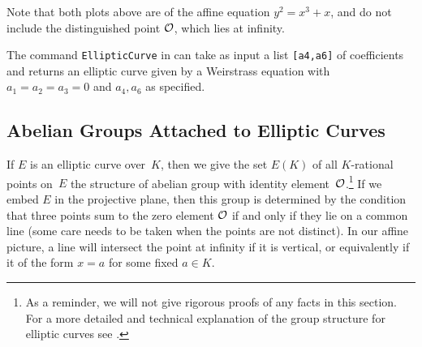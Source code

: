 Note that both plots above are of the affine equation $y^2 = x^3 + x$,
and do not include the distinguished point $\mathcal{O}$, which lies at
infinity.

\begin{remark}
The command {\tt{EllipticCurve}} in \sage
can take as input a list {\tt{[a4,a6]}}
of coefficients and returns an elliptic curve given
by a Weirstrass equation with $a_1=a_2=a_3=0$ and
$a_4,a_6$ as specified.
\end{remark}

\subsection{Abelian Groups Attached to Elliptic Curves}
If $E$ is an elliptic curve over~$K$, then we give the set
$E(K)$ of all $K$-rational points on~$E$ the structure of abelian
group with identity element~$\mathcal{O}$.\footnote{
As a reminder, we will not give rigorous proofs of any facts in
this section. For a more detailed and technical explanation of
the group structure for elliptic curves
see \cite[Ch.~III.2]{silverman:aec}.
}
If we embed $E$ in the projective
plane, then this group is determined by the condition that three
points sum to the zero element $\mathcal{O}$ if and only if they lie on a
common line (some care needs to be taken when the points are not
distinct). In our affine picture, a line will intersect the point
at infinity if it is vertical, or equivalently if it of the form
$x=a$ for some fixed $a\in K$.


